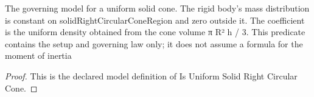 \begin{definition}
  \label{def:physics:phyx-mini-0776:phyxmini0776-isuniformsolidrightcircularcone}
  The governing model for a uniform solid cone. The rigid body's mass distribution is constant on solidRightCircularConeRegion and zero outside it. The coefficient is the uniform density obtained from the cone volume π R² h / 3. This predicate contains the setup and governing law only; it does not assume a formula for the moment of inertia
\end{definition}
\begin{proof}
  This is the declared model definition of Is Uniform Solid Right Circular Cone.
\end{proof}
